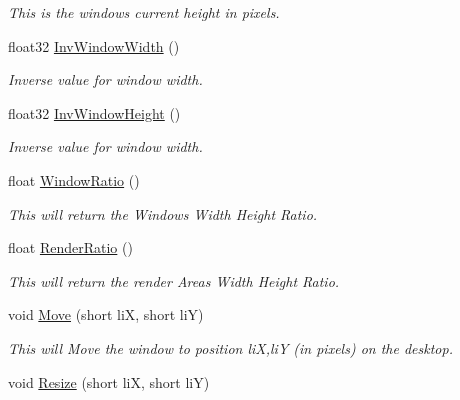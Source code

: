 \begin{DoxyCompactItemize}
\begin{DoxyCompactList}\small\item\em This is the windows current height in pixels. \end{DoxyCompactList}\item 
\hypertarget{classc_window_aac3ea8f88c331b9634a405f7e44a9c52}{
float32 \hyperlink{classc_window_aac3ea8f88c331b9634a405f7e44a9c52}{InvWindowWidth} ()}
\label{classc_window_aac3ea8f88c331b9634a405f7e44a9c52}

\begin{DoxyCompactList}\small\item\em Inverse value for window width. \end{DoxyCompactList}\item 
\hypertarget{classc_window_afe94b149aa308b6aad61c0652520c860}{
float32 \hyperlink{classc_window_afe94b149aa308b6aad61c0652520c860}{InvWindowHeight} ()}
\label{classc_window_afe94b149aa308b6aad61c0652520c860}

\begin{DoxyCompactList}\small\item\em Inverse value for window width. \end{DoxyCompactList}\item 
\hypertarget{classc_window_ad381b655ced5793bdb8a8adbb3271c9e}{
float \hyperlink{classc_window_ad381b655ced5793bdb8a8adbb3271c9e}{WindowRatio} ()}
\label{classc_window_ad381b655ced5793bdb8a8adbb3271c9e}

\begin{DoxyCompactList}\small\item\em This will return the Windows Width Height Ratio. \end{DoxyCompactList}\item 
\hypertarget{classc_window_a5b3516e94d88912966d4f7e83278ec1d}{
float \hyperlink{classc_window_a5b3516e94d88912966d4f7e83278ec1d}{RenderRatio} ()}
\label{classc_window_a5b3516e94d88912966d4f7e83278ec1d}

\begin{DoxyCompactList}\small\item\em This will return the render Areas Width Height Ratio. \end{DoxyCompactList}\item 
\hypertarget{classc_window_a11e2c0045091c6e6826361f8c68b2022}{
void \hyperlink{classc_window_a11e2c0045091c6e6826361f8c68b2022}{Move} (short liX, short liY)}
\label{classc_window_a11e2c0045091c6e6826361f8c68b2022}

\begin{DoxyCompactList}\small\item\em This will Move the window to position liX,liY (in pixels) on the desktop. \end{DoxyCompactList}\item 
\hypertarget{classc_window_a38129c91195b1e7f5711aecc1ffb4d77}{
void \hyperlink{classc_window_a38129c91195b1e7f5711aecc1ffb4d77}{Resize} (short liX, short liY)}
\label{classc_window_a38129c91195b1e7f5711aecc1ffb4d77}


\end{DoxyCompactItemize}
